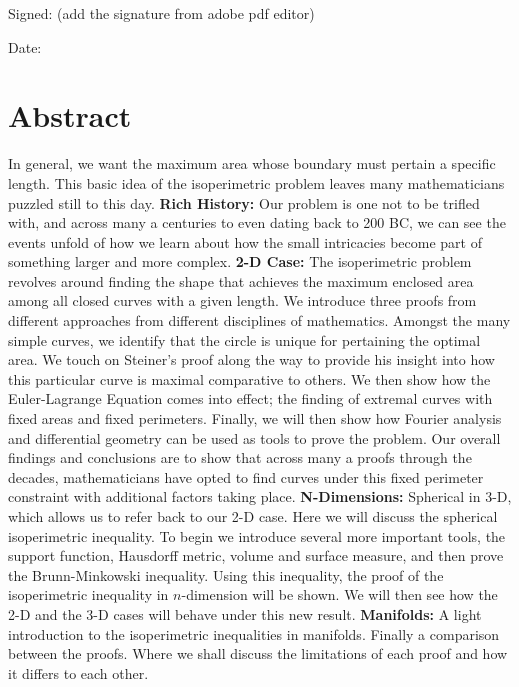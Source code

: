\documentclass[a4paper]{book}
\numberwithin{theorem}{section}%
\begin{document}
\bigskip

\noindent
Signed: (add the signature from adobe pdf editor)


\bigskip

\noindent
Date: 

\chapter*{Abstract}
In general, we want the maximum area whose boundary must pertain a specific length. This basic idea of the isoperimetric problem leaves many mathematicians puzzled still to this day.
\newline
\newline
\textbf{Rich History:} Our problem is one not to be trifled with, and across many a centuries to even dating back to 200 BC, we can see the events unfold of how we learn about how the small intricacies become part of something larger and more complex. 
\newline
\newline
\textbf{2-D Case:} The isoperimetric problem revolves around finding the shape that achieves the maximum enclosed area among all closed curves with a given length. We introduce three proofs from different approaches from different disciplines of mathematics. Amongst the many simple curves, we identify that the circle is unique for pertaining the optimal area. We touch on Steiner's proof along the way to provide his insight into how this particular curve is maximal comparative to others. We then show how the Euler-Lagrange Equation comes into effect; the finding of extremal curves with fixed areas and fixed perimeters. Finally, we will then show how Fourier analysis and differential geometry can be used as tools to prove the problem. Our overall findings and conclusions are to show that across many a proofs through the decades, mathematicians have opted to find curves under this fixed perimeter constraint with additional factors taking place. 
\newline
\newline
\textbf{N-Dimensions:} Spherical in 3-D, which allows us to refer back to our 2-D case. Here we will discuss the spherical isoperimetric inequality. To begin we introduce several more important tools, the support function, Hausdorff metric, volume and surface measure, and then prove the Brunn-Minkowski inequality. Using this inequality, the proof of the isoperimetric inequality in $n$-dimension will be shown. We will then see how the 2-D and the 3-D cases will behave under this new result.
\newline
\newline
\textbf{Manifolds:} A light introduction to the isoperimetric inequalities in manifolds.
\newline
\newline
Finally a comparison between the proofs. Where we shall discuss the limitations of each proof and how it differs to each other.
\end{document}

